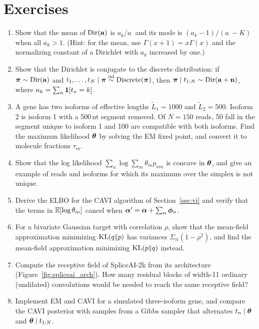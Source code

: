 \section*{Exercises}

\begin{enumerate}
  \item Show that the mean of $\operatorname{Dir}(\mathbf{a})$ is $a_k/a_\cdot$ and its mode is $(a_k-1)/(a_\cdot-K)$ when all $a_k>1$. (Hint: for the mean, use $\Gamma(x+1)=x\Gamma(x)$ and the normalizing constant of a Dirichlet with $a_k$ increased by one.)
  \item Show that the Dirichlet is conjugate to the discrete distribution: if $\boldsymbol{\pi}\sim\operatorname{Dir}(\mathbf{a})$ and $t_1,\dots,t_N\mid\boldsymbol{\pi}\overset{\text{iid}}{\sim}\operatorname{Discrete}(\boldsymbol{\pi})$, then $\boldsymbol{\pi}\mid t_{1:N}\sim\operatorname{Dir}(\mathbf{a}+\mathbf{n})$, where $n_k=\sum_n\mathbf{1}[t_n=k]$.
  \item A gene has two isoforms of effective lengths $\tilde L_1=1000$ and $\tilde L_2=500$. Isoform 2 is isoform 1 with a 500\,nt segment removed. Of $N=150$ reads, 50 fall in the segment unique to isoform 1 and 100 are compatible with both isoforms. Find the maximum likelihood $\boldsymbol{\theta}$ by solving the EM fixed point, and convert it to molecule fractions $\tau_m$.
  \item Show that the log likelihood $\sum_n\log\sum_m\theta_m p_{nm}$ is concave in $\boldsymbol{\theta}$, and give an example of reads and isoforms for which its maximum over the simplex is not unique.
  \item Derive the ELBO for the CAVI algorithm of Section~\ref{sec:vi} and verify that the terms in $\mathbb{E}[\log\theta_m]$ cancel when $\boldsymbol{\alpha}'=\boldsymbol{\alpha}+\sum_n\boldsymbol{\phi}_n$.
  \item For a bivariate Gaussian target with correlation $\rho$, show that the mean-field approximation minimizing $\operatorname{KL}(q\|p)$ has variances $\Sigma_{ii}(1-\rho^2)$, and find the mean-field approximation minimizing $\operatorname{KL}(p\|q)$ instead.
  \item Compute the receptive field of SpliceAI-2k from its architecture (Figure~\ref{fig:spliceai_arch}). How many residual blocks of width-11 ordinary (undilated) convolutions would be needed to reach the same receptive field?
  \item Implement EM and CAVI for a simulated three-isoform gene, and compare the CAVI posterior with samples from a Gibbs sampler that alternates $t_n\mid\boldsymbol{\theta}$ and $\boldsymbol{\theta}\mid t_{1:N}$.
\end{enumerate}
